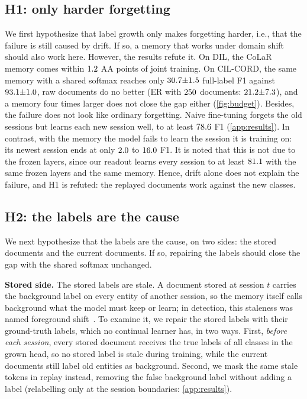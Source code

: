 \documentclass[10pt,twocolumn,letterpaper]{article}
\newcommand{\runin}[1]{\par\addvspace{0.7ex plus .3ex minus .1ex}\noindent\textbf{#1}\hspace{1em}\ignorespaces}
\begin{document}
\subsection{H1: only harder forgetting}
\label{sec:h0}
We first hypothesize that label growth only makes forgetting harder, i.e., that the failure is still caused by drift. If so, a memory that works under domain shift should also work here. However, the results refute it. On DIL, the CoLaR memory comes within $1.2$ AA points of joint training. On CIL-CORD, the same memory with a shared softmax reaches only $30.7{\pm}1.5$ full-label F1 against $93.1{\pm}1.0$, raw documents do no better (ER with $250$ documents: $21.2{\pm}7.3$), and a memory four times larger does not close the gap either (\cref{fig:budget}). Besides, the failure does not look like ordinary forgetting. Naive fine-tuning forgets the old sessions but learns each new session well, to at least $78.6$ F1 (\cref{app:results}). In contrast, with the memory the model fails to learn the session it is training on: its newest session ends at only $2.0$ to $16.0$ F1. It is noted that this is not due to the frozen layers, since our readout learns every session to at least $81.1$ with the same frozen layers and the same memory. Hence, drift alone does not explain the failure, and H1 is refuted: the replayed documents work against the new classes.

\subsection{H2: the labels are the cause}
\label{sec:h1}
We next hypothesize that the labels are the cause, on two sides: the stored documents and the current documents. If so, repairing the labels should close the gap with the shared softmax unchanged.

\runin{Stored side.} The stored labels are stale. A document stored at session $t$ carries the background label on every entity of another session, so the memory itself calls background what the model must keep or learn; in detection, this staleness was named foreground shift~\citep{liu2023abr}. To examine it, we repair the stored labels with their ground-truth labels, which no continual learner has, in two ways. First, \emph{before each session}, every stored document receives the true labels of all classes in the grown head, so no stored label is stale during training, while the current documents still label old entities as background. Second, we mask the same stale tokens in replay instead, removing the false background label without adding a label (relabelling only at the session boundaries: \cref{app:results}).
\end{document}
